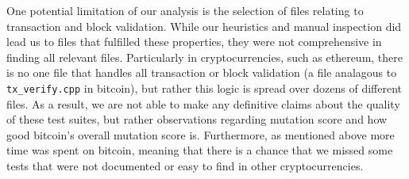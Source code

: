 One potential limitation of our analysis is the selection of files relating to transaction and block validation. While our heuristics and manual inspection did lead us to files that fulfilled these
properties, they were not comprehensive in finding all relevant files. Particularly in cryptocurrencies, such as ethereum, there is no one file that handles all transaction or block validation (a file analagous
to {\tt tx\_verify.cpp}  in bitcoin), but rather this logic is spread over dozens of different files. As a result, we are not able to make any definitive claims about the quality of these test suites, but rather
observations regarding mutation score and how good bitcoin's overall mutation score is. Furthermore, as mentioned above more time was spent on bitcoin, meaning that there is a chance that we missed
some tests that were not documented or easy to find in other cryptocurrencies.
